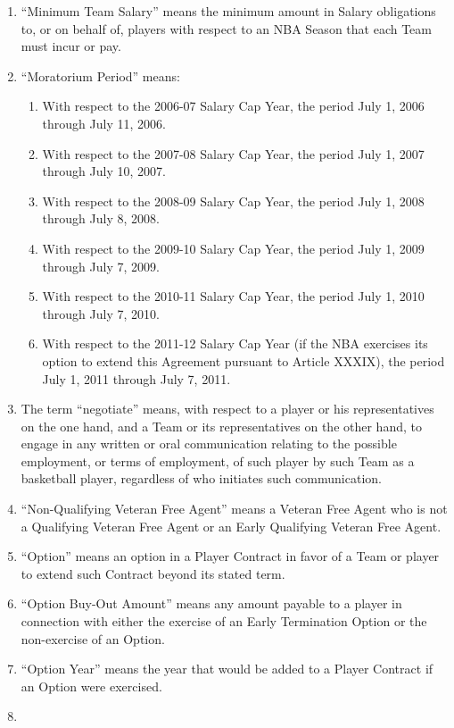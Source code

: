 \documentclass[
]{book}
\providecommand{\tightlist}{%
  \setlength{\itemsep}{0pt}\setlength{\parskip}{0pt}}
\begin{document}
\begin{enumerate}
\item
  ``Minimum Team Salary'' means the minimum amount in Salary obligations to, or on behalf of, players with respect to an NBA Season that each Team must incur or pay.
\item
  ``Moratorium Period'' means:

  \begin{enumerate}
  \def\labelenumii{(\roman{enumii})}
  \tightlist
  \item
    With respect to the 2006-07 Salary Cap Year, the period July 1, 2006 through July 11, 2006.
  \item
    With respect to the 2007-08 Salary Cap Year, the period July 1, 2007 through July 10, 2007.
  \item
    With respect to the 2008-09 Salary Cap Year, the period July 1, 2008 through July 8, 2008.
  \item
    With respect to the 2009-10 Salary Cap Year, the period July 1, 2009 through July 7, 2009.
  \item
    With respect to the 2010-11 Salary Cap Year, the period July 1, 2010 through July 7, 2010.
  \item
    With respect to the 2011-12 Salary Cap Year (if the NBA exercises its option to extend this Agreement pursuant to Article XXXIX), the period July 1, 2011 through July 7, 2011.
  \end{enumerate}
\item
  The term ``negotiate'' means, with respect to a player or his representatives on the one hand, and a Team or its representatives on the other hand, to engage in any written or oral communication relating to the possible employment, or terms of employment, of such player by such Team as a basketball player, regardless of who initiates such communication.
\item
  ``Non-Qualifying Veteran Free Agent'' means a Veteran Free Agent who is not a Qualifying Veteran Free Agent or an Early Qualifying Veteran Free Agent.
\item
  ``Option'' means an option in a Player Contract in favor of a Team or player to extend such Contract beyond its stated term.
\item
  ``Option Buy-Out Amount'' means any amount payable to a player in connection with either the exercise of an Early Termination Option or the non-exercise of an Option.
\item
  ``Option Year'' means the year that would be added to a Player Contract if an Option were exercised.
\item

\end{enumerate}
\end{document}
